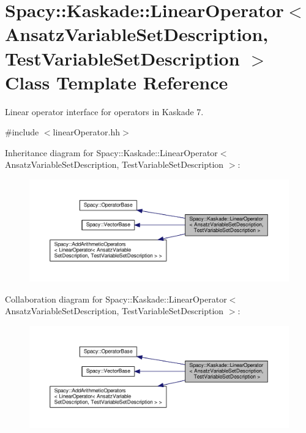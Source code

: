 \hypertarget{classSpacy_1_1Kaskade_1_1LinearOperator}{\section{Spacy\-:\-:Kaskade\-:\-:Linear\-Operator$<$ Ansatz\-Variable\-Set\-Description, Test\-Variable\-Set\-Description $>$ Class Template Reference}
\label{classSpacy_1_1Kaskade_1_1LinearOperator}
}


Linear operator interface for operators in Kaskade 7.  




{\ttfamily \#include $<$linear\-Operator.\-hh$>$}



Inheritance diagram for Spacy\-:\-:Kaskade\-:\-:Linear\-Operator$<$ Ansatz\-Variable\-Set\-Description, Test\-Variable\-Set\-Description $>$\-:
\nopagebreak
\begin{figure}[H]
\begin{center}
\leavevmode
\includegraphics[width=350pt]{classSpacy_1_1Kaskade_1_1LinearOperator__inherit__graph}
\end{center}
\end{figure}


Collaboration diagram for Spacy\-:\-:Kaskade\-:\-:Linear\-Operator$<$ Ansatz\-Variable\-Set\-Description, Test\-Variable\-Set\-Description $>$\-:
\nopagebreak
\begin{figure}[H]
\begin{center}
\leavevmode
\includegraphics[width=350pt]{classSpacy_1_1Kaskade_1_1LinearOperator__coll__graph}
\end{center}
\end{figure}
